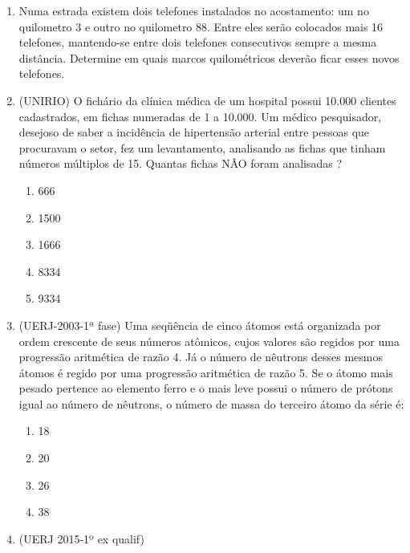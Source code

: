 \begin{enumerate}
\item Numa estrada existem dois telefones instalados no acostamento: um no quilometro 3 e outro no quilometro 88. Entre eles serão colocados mais 16 telefones, mantendo-se entre dois telefones consecutivos sempre a mesma distância. Determine em quais marcos quilométricos deverão ficar esses novos telefones.

\item (UNIRIO) O fichário da clínica médica de um hospital possui 10.000 clientes cadastrados, em fichas numeradas de 1 a 10.000. Um médico pesquisador, desejoso de saber a incidência de hipertensão arterial entre pessoas que procuravam o setor, fez um levantamento, analisando as fichas que tinham números múltiplos de 15. Quantas fichas NÃO foram analisadas ?
\begin{enumerate}
\item {} 
666

\item {} 
1500

\item {} 
1666

\item {} 
8334

\item {} 
9334

\end{enumerate}

\item (UERJ-2003-1ª fase) Uma seqüência de cinco átomos está organizada por ordem crescente de seus números atômicos, cujos valores são regidos por uma progressão aritmética de razão 4. Já o número de nêutrons desses mesmos átomos é regido por uma progressão aritmética de razão 5.
Se o átomo mais pesado pertence ao elemento ferro e o mais leve possui o número de prótons igual ao número de nêutrons, o número de massa do terceiro átomo da série é:
\begin{enumerate}
\item {} 
18

\item {} 
20

\item {} 
26

\item {} 
38

\end{enumerate}

\item (UERJ 2015-1º ex qualif)
\label{\detokenize{AF107-E:fig-charge}}
\begin{figure}[H]
\centering


\end{figure}
\end{enumerate}
